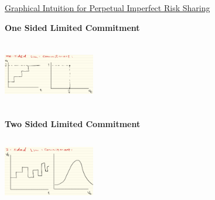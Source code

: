 \documentclass{article}
\begin{document}
\underline{Graphical Intuition for Perpetual Imperfect Risk Sharing}
\begin{center}
\textbf{One Sided Limited Commitment} \par
\includegraphics[width=4cm, height=3cm]{pic17}
\end{center}
\begin{center}
\textbf{Two Sided Limited Commitment} \par
\includegraphics[width=4cm, height=3cm]{pic18}
\end{center}
\end{document}
